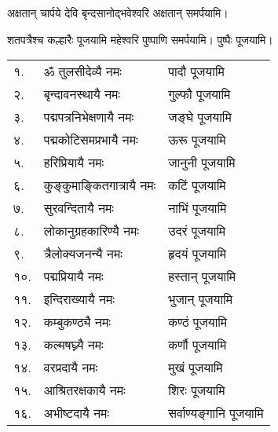 {अक्षतान् चार्पये देवि बृन्दसानोद्भवेश्वरि}
अक्षतान् समर्पयामि।\medskip

{शतपत्रैश्च कल्हारैः पूजयामि महेश्वरि}
 पुष्पाणि समर्पयामि।  पुष्पैः पूजयामि।

\begin{longtable}{ll@{— }l}
१.& ॐ तुलसीदेव्यै नमः & पादौ पूजयामि \\
२.& बृन्दावनस्थायै नमः & गुल्फौ पूजयामि\\
३.& पद्मपत्रनिभेक्षणायै नमः & जङ्घे पूजयामि  \\
४.& पद्मकोटिसमप्रभायै नमः & ऊरू पूजयामि\\
५.& हरिप्रियायै नमः & जानुनी पूजयामि   \\
६.& कुङ्कुमाङ्कितगात्रायै नमः & कटिं पूजयामि \\
७.& सुरवन्दितायै नमः & नाभिं पूजयामि        \\
८.& लोकानुग्रहकारिण्यै नमः & उदरं पूजयामि\\
९.& त्रैलोक्यजनन्यै नमः & हृदयं पूजयामि    \\
१०.& पद्मप्रियायै नमः & हस्तान् पूजयामि\\
११.& इन्दिराख्यायै नमः & भुजान् पूजयामि\\
१२.& कम्बुकण्ठ्यै नमः & कण्ठं पूजयामि\\
१३.& कल्मषघ्न्यै नमः & कर्णौ पूजयामि  \\
१४.& वरप्रदायै नमः & मुखं  पूजयामि\\
१५.& आश्रितरक्षकायै नमः & शिरः पूजयामि\\
१६.& अभीष्टदायै नमः & सर्वाण्यङ्गानि पूजयामि   \\
\end{longtable}

